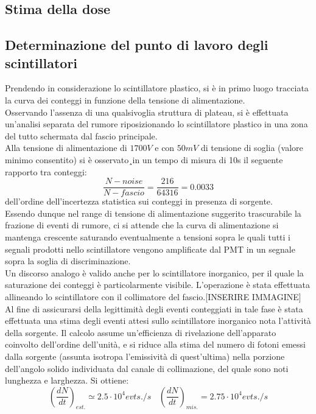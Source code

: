 \documentclass[11pt]{article}
\begin{document}
\subsection{Stima della dose}

\subsection{Determinazione del punto di lavoro degli scintillatori}
Prendendo in considerazione lo scintillatore plastico, si è in primo luogo tracciata la curva dei conteggi in funzione della tensione di alimentazione. \\
Osservando l'assenza di una qualsivoglia struttura di plateau, si è effettuata un'analisi separata del rumore riposizionando lo scintillatore plastico in una zona del tutto schermata dal fascio principale. \\ 
Alla tensione di alimentazione di $ 1700V$ e con $ 50 mV$ di tensione di soglia (valore minimo consentito) si è osservato¸in un tempo di misura di 10s il seguente rapporto tra conteggi:
\begin{equation}
\frac{N-noise}{N-fascio}=\frac{216}{64316}=0.0033
\end{equation}
dell'ordine dell'incertezza statistica sui conteggi in presenza di sorgente. \\
Essendo dunque nel range di tensione di alimentazione suggerito trascurabile la frazione di eventi di rumore, ci si attende che la curva di alimentazione si mantenga crescente saturando eventualmente a tensioni sopra le quali tutti i segnali prodotti nello scintillatore vengono amplificate dal PMT in un segnale sopra la soglia di discriminazione. \\
Un discorso analogo è valido anche per lo scintillatore inorganico, per il quale la saturazione dei conteggi è particolarmente visibile. L'operazione è stata effettuata allineando lo scintillatore con il collimatore del fascio.[INSERIRE IMMAGINE]\\
Al fine di assicurarsi della legittimità degli eventi conteggiati in tale fase è stata effettuata una stima degli eventi attesi sullo scintillatore inorganico nota l'attività della sorgente.
Il calcolo assume un'efficienza di rivelazione dell'apparato coinvolto dell'ordine dell'unità, e si riduce alla stima del numero di fotoni emessi dalla sorgente (assunta isotropa l'emissività di quest'ultima) nella porzione dell'angolo solido individuata dal canale di collimazione, del quale sono noti lunghezza e larghezza. Si ottiene: \\
\begin{equation}
(\frac{dN}{dt})_{est.}\simeq 2.5\cdot 10^{4} evts./s \ \ \ \ (\frac{dN}{dt})_{mis.}=2.75\cdot 10^{4} evts./s
\end{equation}
\end{document}
